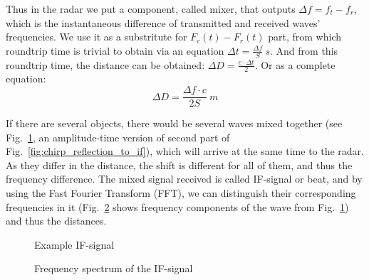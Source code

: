 \documentclass{article}
\begin{document}
Thus in the radar we put a component, called mixer, that outputs $\Delta f = f_t - f_r$, which is the instantaneous difference of transmitted and received waves' frequencies.
We use it as a substritute for $F_c(t) - F_r(t)$ part, from which roundtrip time is trivial to obtain via an equation $\Delta t = \frac{\Delta f}{S}\SI{}{s}$.
And from this roundtrip time, the distance can be obtained: $\Delta D = \frac{c \cdot \Delta t}{2}$.
Or as a complete equation: \[\Delta D = \frac{\Delta f \cdot c}{2S}\SI{}{m}\]

If there are several objects, there would be several waves mixed together (see Fig.~\ref{fig:if_signal}, an amplitude-time version of second part of Fig.~\ref{fig:chirp_reflection_to_if}), which will arrive at the same time to the radar.
As they differ in the distance, the shift is different for all of them, and thus the frequency difference.
The mixed signal received is called IF-signal or beat, and by using the Fast Fourier Transform (FFT), we can distinguish their corresponding frequencies in it (Fig.~\ref{fig:fft_frequencies} shows frequency components of the wave from Fig.~\ref{fig:if_signal}) and thus the distances.

\begin{figure}[h]
    \centering
    \caption{Example IF-signal}
    \label{fig:if_signal}
\end{figure}

\begin{figure}[h]
    \centering
    \caption{Frequency spectrum of the IF-signal}
    \label{fig:fft_frequencies}
\end{figure}
\end{document}

